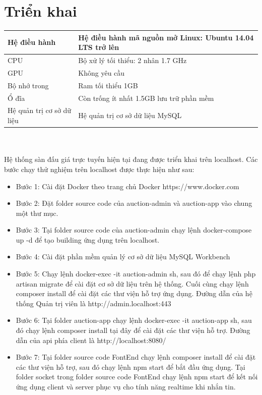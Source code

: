 \documentclass[../DoAn.tex]{subfiles}
\begin{document}
\section{Triển khai}
    \tabletail{\hline}
    \label{bang416}
    \begin{supertabular}{| p{.30\textwidth}|p{.60\textwidth}|} 
    \hline
        Hệ điều hành& Hệ điều hành mã nguồn mở Linux: Ubuntu 14.04 LTS trở lên\\\hline
        CPU& Bộ xử lý tối thiểu: 2 nhân 1.7 GHz\\\hline
        GPU& Không yêu cầu\\\hline
        Bộ nhớ trong& Ram tối thiểu 1GB \\\hline
        Ổ đĩa& Còn trống ít nhất 1.5GB lưu trữ phần mềm \\\hline
        Hệ quản trị cơ sở dữ liệu&Hệ quản trị cơ sở dữ liệu MySQL \\\hline
    \end{supertabular}\\
\\
Hệ thống sàn đấu giá trực tuyến hiện tại đang được triển khai trên localhost. Các bước chạy thử nghiệm trên localhost được thực hiện như sau: 
\begin{itemize}
    \item Bước 1: Cài đặt Docker theo trang chủ Docker https://www.docker.com
    \item Bước 2: Đặt folder source code của auction-admin và auction-app vào chung một thư mục. 
    \item Bước 3: Tại folder source code của auction-admin chạy lệnh docker-compose up -d để tạo building ứng dụng trên localhost.
    \item Bước 4: Cài đặt phần mềm quản lý cơ sở dữ liệu MySQL Workbench
    \item Bước 5: Chạy lệnh docker-exec -it auction-admin sh, sau đó để chạy lệnh php artisan migrate để cài đặt cơ sở dữ liệu trên hệ thống. Cuối cùng chạy lệnh composer install để cài đặt các thư viện hỗ trợ ứng dụng. Đường dẫn của hệ thống Quản trị viên là http://admin.localhost:443
    \item Bước 6: Tại folder auction-app chạy lệnh docker-exec -it auction-app sh, sau đó chạy lệnh composer install tại đây để cài đặt các thư viện hỗ trợ. Đường dẫn của api phía client là http://localhost:8080/
    \item Bước 7: Tại folder source code FontEnd chạy lệnh composer install để cài đặt các thư viện hỗ trợ, sau đó chạy lệnh npm start để bắt đầu ứng dụng. Tại folder socket trong folder source code FontEnd chạy lệnh npm start để kết nối ứng dụng client và server phục vụ cho tính năng realtime khi nhắn tin.
\end{itemize}
\newpage
\end{document}
